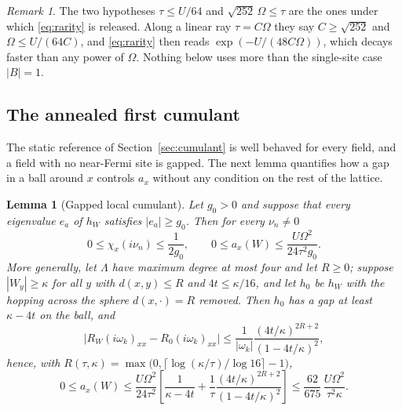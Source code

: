 \documentclass[11pt]{article}
\newtheorem{lemma}[theorem]{Lemma}
\theoremstyle{definition}
\theoremstyle{remark}
\newtheorem{remark}[theorem]{Remark}
\begin{document}
\begin{remark}
The two hypotheses $\tau\le U/64$ and $\sqrt{252}\,\Omega\le\tau$ are the ones under
which \eqref{eq:rarity} is released. Along a linear ray $\tau=C\Omega$ they say
$C\ge\sqrt{252}$ and $\Omega\le U/(64C)$, and \eqref{eq:rarity} then reads
$\exp(-U/(48C\Omega))$, which decays faster than any power of $\Omega$. Nothing below
uses more than the single-site case $|B|=1$.
\end{remark}

\subsection{The annealed first cumulant}

The static reference of Section~\ref{sec:cumulant} is well behaved for every field,
and a field with no near-Fermi site is gapped. The next lemma quantifies how a gap
in a ball around $x$ controls $a_x$ without any condition on the rest of the
lattice.

\begin{lemma}[Gapped local cumulant]
\label{lem:gapped}
Let $g_0>0$ and suppose that every eigenvalue $e_a$ of $h_W$ satisfies $|e_a|\ge g_0$.
Then for every $\nu_n\ne0$
\begin{equation}
0\le\chi_x(i\nu_n)\le\frac{1}{2g_0},\qquad
0\le a_x(W)\le\frac{U\Omega^2}{24\tau^2g_0}.
\label{eq:gapped}
\end{equation}
More generally, let $\Lambda$ have maximum degree at most four and let
$R\ge0$; suppose $|W_y|\ge\kappa$ for all $y$ with $d(x,y)\le R$ and $4t\le\kappa/16$,
and let $h_0$ be $h_W$ with the hopping across the sphere $d(x,\cdot)=R$ removed. Then
$h_0$ has a gap at least $\kappa-4t$ on the ball, and
\begin{equation}
\bigl|R_W(i\omega_k)_{xx}-R_0(i\omega_k)_{xx}\bigr|
\le\frac{1}{|\omega_k|}\frac{(4t/\kappa)^{2R+2}}{(1-4t/\kappa)^2},
\label{eq:leak}
\end{equation}
hence, with $R(\tau,\kappa)=\max\bigl(0,\lceil\log(\kappa/\tau)/\log16\rceil-1\bigr)$,
\begin{equation}
0\le a_x(W)\le\frac{U\Omega^2}{24\tau^2}\left[\frac{1}{\kappa-4t}
+\frac{1}{\tau}\frac{(4t/\kappa)^{2R+2}}{(1-4t/\kappa)^2}\right]
\le\frac{62}{675}\,\frac{U\Omega^2}{\tau^2\kappa}.
\label{eq:buffer}
\end{equation}
\end{lemma}
\end{document}
